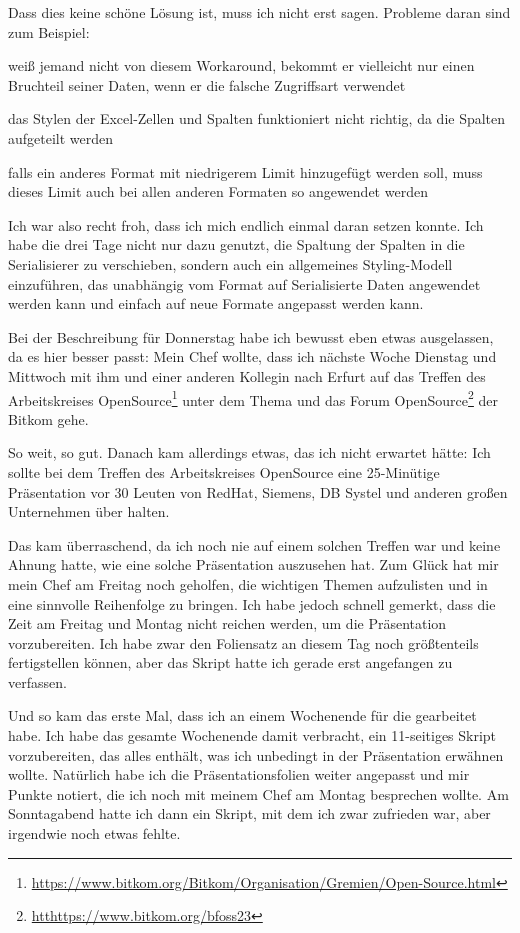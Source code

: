 Dass dies keine schöne Lösung ist, muss ich nicht erst sagen.
Probleme daran sind zum Beispiel:

\begin{smitemize}
    \item weiß jemand nicht von diesem Workaround, bekommt er vielleicht nur einen Bruchteil seiner Daten, wenn er die falsche Zugriffsart verwendet
    \item das Stylen der Excel-Zellen und Spalten funktioniert nicht richtig, da die Spalten aufgeteilt werden
    \item falls ein anderes Format mit niedrigerem Limit hinzugefügt werden soll, muss dieses Limit auch bei allen anderen Formaten so angewendet werden
\end{smitemize}

Ich war also recht froh, dass ich mich endlich einmal daran setzen konnte.
Ich habe die drei Tage nicht nur dazu genutzt, die Spaltung der Spalten in die Serialisierer zu verschieben, sondern auch ein allgemeines Styling-Modell einzuführen, das unabhängig vom Format auf Serialisierte Daten angewendet werden kann und einfach auf neue Formate angepasst werden kann.

Bei der Beschreibung für Donnerstag habe ich bewusst eben etwas ausgelassen, da es hier besser passt:
Mein Chef wollte, dass ich nächste Woche Dienstag und Mittwoch mit ihm und einer anderen Kollegin nach Erfurt auf das
Treffen des Arbeitskreises OpenSource\footnote{\url{https://www.bitkom.org/Bitkom/Organisation/Gremien/Open-Source.html}} unter dem Thema  und das
Forum OpenSource\footnote{\url{htthttps://www.bitkom.org/bfoss23}} der Bitkom gehe.

So weit, so gut.
Danach kam allerdings etwas, das ich nicht erwartet hätte: Ich sollte bei dem Treffen des Arbeitskreises OpenSource eine 25-Minütige Präsentation vor 30 Leuten von RedHat, Siemens, DB Systel und anderen großen Unternehmen über  halten.

Das kam überraschend, da ich noch nie auf einem solchen Treffen war und keine Ahnung hatte, wie eine solche Präsentation auszusehen hat.
Zum Glück hat mir mein Chef am Freitag noch geholfen, die wichtigen Themen aufzulisten und in eine sinnvolle Reihenfolge zu bringen.
Ich habe jedoch schnell gemerkt, dass die Zeit am Freitag und Montag nicht reichen werden, um die Präsentation vorzubereiten.
Ich habe zwar den Foliensatz an diesem Tag noch größtenteils fertigstellen können, aber das Skript hatte ich gerade erst angefangen zu verfassen.

Und so kam das erste Mal, dass ich an einem Wochenende für die \metaeffekt gearbeitet habe.
Ich habe das gesamte Wochenende damit verbracht, ein 11-seitiges Skript vorzubereiten, das alles enthält, was ich unbedingt in der Präsentation erwähnen wollte.
Natürlich habe ich die Präsentationsfolien weiter angepasst und mir Punkte notiert, die ich noch mit meinem Chef am Montag besprechen wollte.
Am Sonntagabend hatte ich dann ein Skript, mit dem ich zwar zufrieden war, aber irgendwie noch etwas fehlte.
